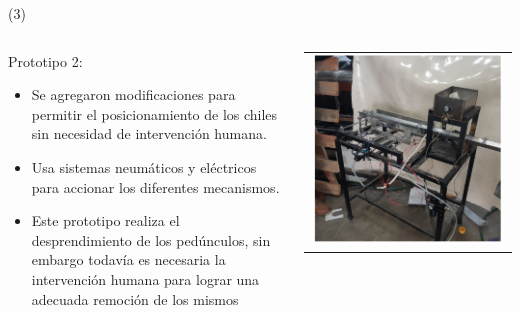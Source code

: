 \begin{frame}{ (3)}
\begin{columns}
\begin{column}{0.55\textwidth}
Prototipo 2:
\begin{itemize}
        \item Se agregaron modificaciones para permitir el posicionamiento de
los chiles sin necesidad de intervención humana. 
        \item Usa sistemas neumáticos y eléctricos para accionar los diferentes mecanismos.
        \item Este prototipo realiza el desprendimiento de los pedúnculos, sin embargo todavía es necesaria la intervención humana para lograr una adecuada remoción de los mismos
	\end{itemize}
\end{column}
\begin{column}{0.45\textwidth}  
\begin{center}
     \begin{tabular}{c}
         \includegraphics[width=0.98\textwidth]{2022_MaquinaChilePiquin/figs/Prototipo2.png}\\
          \end{tabular}
\end{center}
\end{column} 
\end{columns} 
\end{frame}


